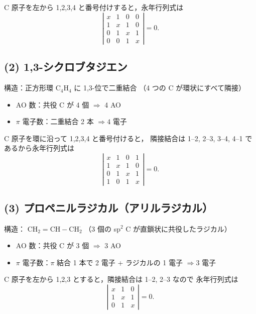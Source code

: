 \documentclass[a4paper,12pt]{jlreq}
\begin{document}
C 原子を左から 1,2,3,4 と番号付けすると，永年行列式は
\[
\left|
\begin{array}{cccc}
x & 1 & 0 & 0 \\
1 & x & 1 & 0 \\
0 & 1 & x & 1 \\
0 & 0 & 1 & x
\end{array}
\right| = 0.
\]

\subsection*{(2) 1,3-シクロブタジエン}

構造：正方形環 \(\mathrm{C_4H_4}\) に 1,3-位で二重結合
（4 つの C が環状にすべて隣接）

\begin{itemize}
  \item AO 数：共役 C が 4 個 $\Rightarrow$ 4 AO
  \item $\pi$ 電子数：二重結合 2 本 $\Rightarrow 4$ 電子
\end{itemize}

C 原子を環に沿って 1,2,3,4 と番号付けると，
隣接結合は 1–2, 2–3, 3–4, 4–1 であるから永年行列式は
\[
\left|
\begin{array}{cccc}
x & 1 & 0 & 1 \\
1 & x & 1 & 0 \\
0 & 1 & x & 1 \\
1 & 0 & 1 & x
\end{array}
\right| = 0.
\]

\subsection*{(3) プロペニルラジカル（アリルラジカル）}

構造： \(\mathrm{CH_2\!=CH\!-\!CH_2^{\boldsymbol{\cdot}}}\)  
（3 個の sp$^2$ C が直鎖状に共役したラジカル）

\begin{itemize}
  \item AO 数：共役 C が 3 個 $\Rightarrow$ 3 AO
  \item $\pi$ 電子数：$\pi$ 結合 1 本で 2 電子 + ラジカルの 1 電子
        $\Rightarrow 3$ 電子
\end{itemize}

C 原子を左から 1,2,3 とすると，隣接結合は 1–2, 2–3 なので
永年行列式は
\[
\left|
\begin{array}{ccc}
x & 1 & 0 \\
1 & x & 1 \\
0 & 1 & x
\end{array}
\right| = 0.
\]
\end{document}

